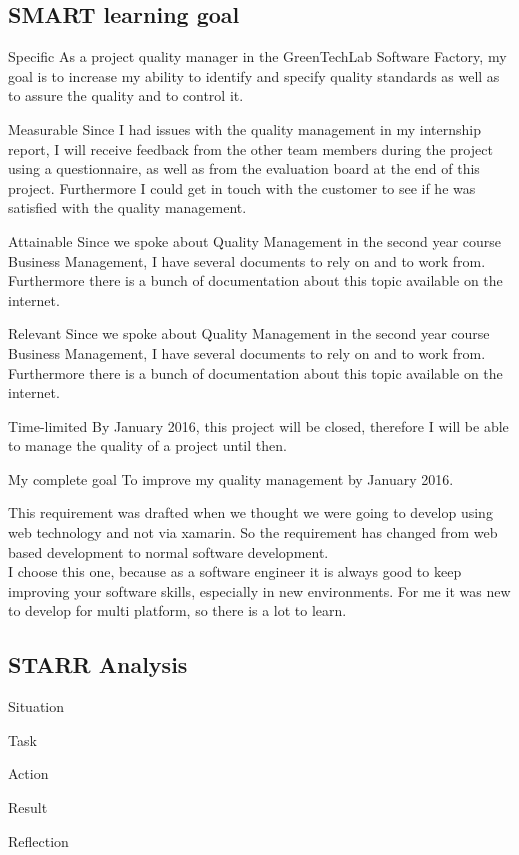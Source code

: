 \documentclass[12pt]{article}
\begin{document}
	\subsection{SMART learning goal}
	\begin{SMART}
	    \item[Specific] As a project quality manager in the GreenTechLab Software Factory, my goal is to increase my ability to identify and specify quality standards as well as to assure the quality and to control it.
	    \item[Measurable] Since I had issues with the quality management in my internship report, I will receive feedback from the other team members during the project using a questionnaire, as well as from the evaluation board at the end of this project. Furthermore I could get in touch with the customer to see if he was satisfied with the quality management.
	    \item[Attainable] Since we spoke about Quality Management in the second year course Business Management, I have several documents to rely on and to work from. Furthermore there is a bunch of documentation about this topic available on the internet.
	    \item[Relevant] Since we spoke about Quality Management in the second year course Business Management, I have several documents to rely on and to work from. Furthermore there is a bunch of documentation about this topic available on the internet.
	    \item[Time-limited]By January 2016, this project will be closed, therefore I will be able to manage the quality of a project until then.
	    \item[My complete goal] To improve my quality management by January 2016.
	\end{SMART}
	
	This requirement was drafted when we thought we were going to develop using web technology and not via xamarin. So the requirement has changed from web based development to normal software development. \\
	I choose this one, because as a software engineer it is always good to keep improving your software skills, especially in new environments. For me it was new to develop for multi platform, so there is a lot to learn.
	
	\subsection{STARR Analysis}
	\begin{STARR}
	    \item[Situation] 
	    \item[Task]  
	    \item[Action] 
	    \item[Result] 
	    \item[Reflection]
	\end{STARR}
	
\end{document}
